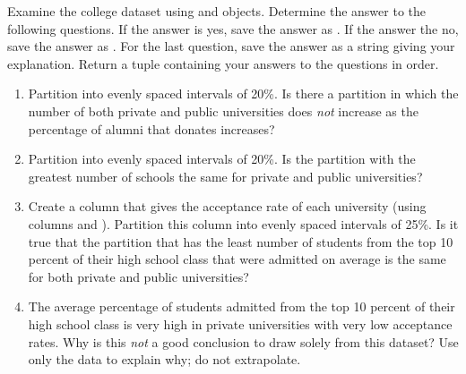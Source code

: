 \begin{problem}
Examine the college dataset using  and  objects.
Determine the answer to the following questions.
If the answer is yes, save the answer as .
If the answer the no, save the answer as .
For the last question, save the answer as a string giving your explanation.
Return a tuple containing your answers to the questions in order.

\begin{enumerate}
\item Partition  into evenly spaced intervals of 20\%.
Is there a partition in which the number of both private and public universities does \emph{not} increase as the percentage of alumni that donates increases?

\item Partition  into evenly spaced intervals of 20\%.
Is the partition with the greatest number of schools the same for private and public universities?

\item Create a column that gives the acceptance rate of each university (using columns  and ).
Partition this column into evenly spaced intervals of 25\%.
Is it true that the partition that has the least number of students from the top 10 percent of their high school class that were admitted on average is the same for both private and public universities?

\item The average percentage of students admitted from the top 10 percent of their high school class is very high in private universities with very low acceptance rates. 
Why is this \emph{not} a good conclusion to draw solely from this dataset? 
Use only the data to explain why; do not extrapolate.
\end{enumerate}
\end{problem}





